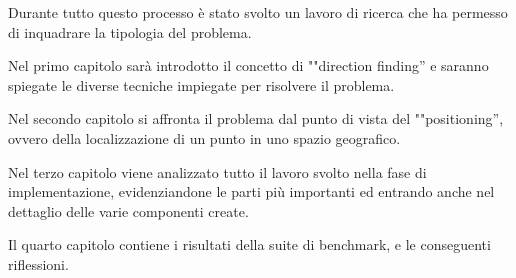 Durante tutto questo processo è stato svolto un lavoro di ricerca che ha permesso di inquadrare la tipologia del problema.

Nel primo capitolo sarà introdotto il concetto di ""direction finding'' e saranno spiegate le diverse tecniche impiegate per risolvere il problema. 

Nel secondo capitolo si affronta il problema dal punto di vista del ""positioning'', ovvero della localizzazione di un punto in uno spazio geografico. 

Nel terzo capitolo viene analizzato tutto il lavoro svolto nella fase di implementazione, evidenziandone le parti più importanti ed entrando anche nel dettaglio delle varie componenti create.

Il quarto capitolo contiene i risultati della suite di benchmark, e le conseguenti riflessioni.